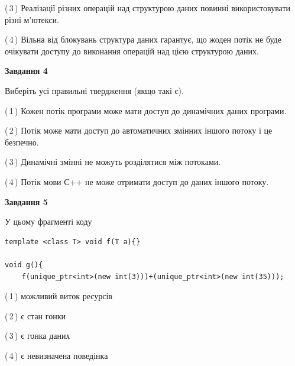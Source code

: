 \documentclass[12pt, ukrainian]{article}
\begin{document}
\begin {large}
{(\,3\,) Реалізації різних операцій над структурою даних повинні використовувати різні м’ютекси.%

(\,4\,) Вільна від блокувань структура даних гарантує, що жоден потік не буде очікувати доступу до виконання операцій над цією структурою даних.%



\begin{center}
\textbf{Завдання 4}
\end{center}
Виберіть усі правильні твердження (якщо такі є).\par
\vspace{2mm}

(\,1\,) Кожен потік програми може мати доступ до динамічних даних програми.%

(\,2\,) Потік може мати доступ до автоматичних змінних іншого потоку і це безпечно.%

(\,3\,) Динамічні змінні не можуть розділятися між потоками.%

(\,4\,) Потік мови С++ не може отримати доступ до даних іншого потоку.%



\begin{center}
\textbf{Завдання 5}
\end{center}
У цьому фрагменті коду
\begin{verbatim}
template <class T> void f(T a){}

void g(){
    f(unique_ptr<int>(new int(3)))+(unique_ptr<int>(new int(35)));
\end{verbatim}

(\,1\,) можливий виток ресурсів%

(\,2\,) є стан гонки%

(\,3\,) є гонка даних%

(\,4\,) є невизначена поведінка%


}
\end {large}
\end{document}
